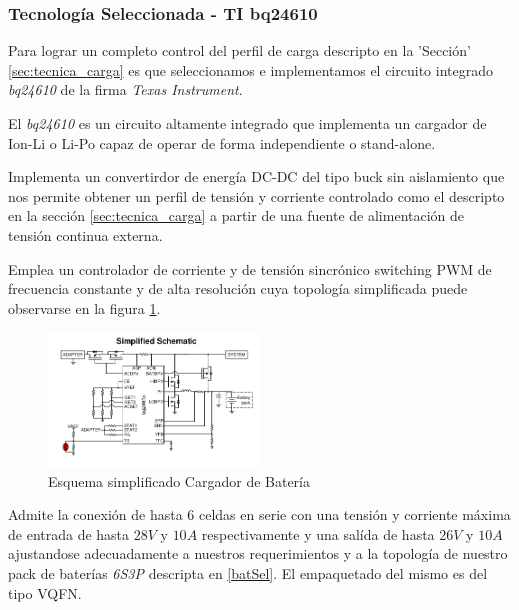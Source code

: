 \documentclass[10pt,a4paper]{article}
\begin{document}
\subsubsection{Tecnología Seleccionada - TI bq24610}

Para lograr un completo control del perfil de carga descripto en la 'Sección'
\ref{sec:tecnica_carga}  es que seleccionamos e implementamos el circuito
integrado \emph{bq24610} de la firma \emph{Texas Instrument}.

El \emph{bq24610} es un circuito altamente integrado que implementa un cargador
de \acrfull{Ion-Li} o \acrfull{Li-Po} capaz de operar de forma independiente o
stand-alone.

Implementa un convertirdor de energía DC-DC del tipo buck sin aislamiento que
nos permite obtener un perfil de tensión y corriente controlado como el
descripto en la sección \ref{sec:tecnica_carga} a partir de una fuente de
alimentación de tensión continua externa.

Emplea un controlador de corriente y de tensión sincrónico
switching PWM de frecuencia constante y de alta resolución cuya
topología simplificada puede observarse en la figura \ref{fig:simp_sch_char}. 

\begin{figure}[h!]
    \centering
    \includegraphics[width=0.5\textwidth]{bat_char/simp_sch_char.png}
    \caption{Esquema simplificado Cargador de Batería}
    \label{fig:simp_sch_char}
\end{figure}
\FloatBarrier

Admite la conexión de hasta 6 celdas en serie con una tensión y
corriente máxima de entrada de hasta $28V$ y $10A$ respectivamente y una salída
de hasta $26V$ y $10A$ ajustandose adecuadamente a nuestros requerimientos y a
la topología de nuestro pack de baterías \emph{6S3P} descripta en \ref{batSel}.
El empaquetado del mismo es del tipo VQFN.
\end{document}
